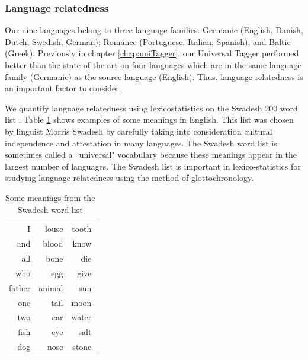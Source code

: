 

\subsubsection{Language relatedness}

Our nine languages belong to three
language families: Germanic (English, Danish, Dutch, Swedish, German);
Romance (Portuguese, Italian, Spanish), and Baltic
(Greek). Previously in chapter \ref{chap:uniTagger}, our Universal Tagger performed better than the state-of-the-art on four languages which are in the same language family (Germanic) as the source language (English). Thus, language relatedness is an important factor to consider.

We quantify language relatedness using lexicostatistics on the Swadesh 200 word list \cite{Meyer92}. Table \ref{tab:swadeshList} shows examples of some meanings in English. This list was chosen by linguist Morris Swadesh by carefully taking into consideration cultural independence and attestation in many languages. The Swadesh word list is sometimes called a ``universal" vocabulary because these meanings appear in the largest number of languages. The Swadesh list is important in lexico-statistics for studying language relatedness using the method of glottochronology. 

\begin{table}[htbp]
  \centering

    \begin{tabular}{rrr}
    I     & louse & tooth \\
    and   & blood & know \\
    all  & bone  & die \\
    who   & egg   & give \\
    father  & animal  & sun \\
    one   & tail  & moon \\
    two   & ear   & water \\
    fish  & eye   & salt \\
    dog   & nose  & stone \\
    \end{tabular}%
  \caption{Some meanings from the Swadesh word list}
  \label{tab:swadeshList}%
\end{table}%


